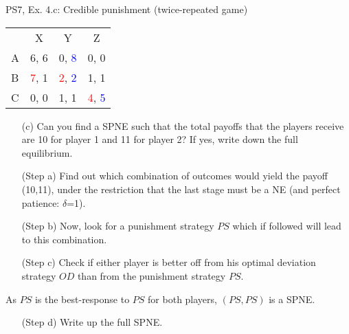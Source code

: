 \begin{frame}{PS7, Ex. 4.c: Credible punishment (twice-repeated game)}
    \vspace{-2pt}
    \begin{table}
      \begin{tabular}{l|c|c|c|}
        \multicolumn{1}{c}{} & \multicolumn{1}{c}{X} & \multicolumn{1}{c}{Y} & \multicolumn{1}{c}{Z}\\\cline{2-4}
        A   & 6, 6 &  0, \textcolor{blue}{8} &  0, 0  \\\cline{2-4}
        B & \textcolor{red}{7}, 1  & \textcolor{red}{2}, \textcolor{blue}{2} &  1, 1  \\\cline{2-4}
        C & 0, 0  & 1, 1 &  \textcolor{red}{4}, \textcolor{blue}{5}  \\\cline{2-4}
      \end{tabular}
    \end{table}
    \vspace{-4pt}
    \begin{itemize}
        \item[(c)] Can you find a SPNE such that the total payoffs that the players receive are 10 for player 1 and 11 for player 2? If yes, write down the full equilibrium.
    \end{itemize}
    \vspace{-8pt}
  \begin{multicols}{2}
    \begin{itemize}
      \item[(Step a)] Find out which combination of outcomes would yield the payoff (10,11), under the restriction that the last stage must be a NE (and perfect patience: $\delta$=1).
      \item[(Step b)] Now, look for a punishment strategy $PS$ which if followed will lead to this combination.
      \item[(Step c)] Check if either player is better off from his optimal deviation strategy $OD$ than from the punishment strategy $PS$.
    \end{itemize}
    \vspace{-6pt}
    As $PS$ is the best-response to $PS$ for both players, $(PS,PS)$ is a SPNE.
    \vspace{-6pt}
    \begin{itemize}
      \item[(Step d)] Write up the full SPNE.
    \end{itemize}
    \vfill\null\columnbreak
    \begin{enumerate}

\end{enumerate}
\end{multicols}
\end{frame}
